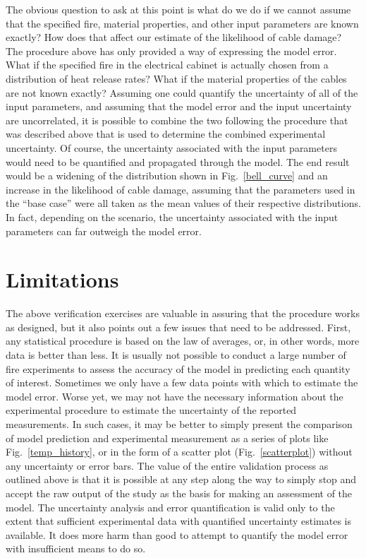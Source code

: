 The obvious question to ask at this point is what do we do if we cannot assume that the specified fire, material properties, and other input parameters are
known exactly? How does that affect our estimate of the likelihood of cable damage? The procedure above has only provided a way of expressing the model
error. What if the specified fire in the electrical cabinet is actually chosen from a distribution of heat release rates?
What if the material properties of the cables are not known exactly? Assuming one could quantify the uncertainty of all of the input parameters, and assuming that the model error
and the input uncertainty are uncorrelated, it is possible to combine the two following the procedure that was described above that is used to determine the combined
experimental uncertainty. Of
course, the uncertainty associated with the input parameters would need to be quantified and propagated through the model. The end result would be a widening of
the distribution shown in Fig.~\ref{bell_curve} and an increase in the likelihood of cable damage, assuming that the parameters used in the ``base case'' were
all taken as the mean values of their respective distributions. In fact, depending on the scenario, the uncertainty associated with the input parameters can far outweigh
the model error.


\section{Limitations}

The above verification exercises are valuable in assuring that the procedure works as designed, but it also points out a few issues that need to be addressed. First, any
statistical procedure is based on the law of averages, or, in other words, more data is better than less. It is usually not possible to conduct a large number of
fire experiments
to assess the accuracy of the model in predicting each quantity of interest. Sometimes we only have a few data points with which to estimate the model error. Worse yet,
we may not have the necessary information about the experimental procedure to estimate the uncertainty of the reported measurements. In such cases, it may be better
to simply present the comparison of model prediction and experimental measurement as a series of plots like Fig.~\ref{temp_history}, or in the form of a scatter plot
(Fig.~\ref{scatterplot}) without any uncertainty or error bars. The value of the entire validation process as outlined above is that it is possible at any step
along the way to simply stop and accept the raw output of the study as the basis for making an assessment of the model. The uncertainty analysis and error
quantification is valid only to
the extent that sufficient experimental data with quantified uncertainty estimates is available. It does more harm than good to attempt to quantify the model error
with insufficient means to do so.

